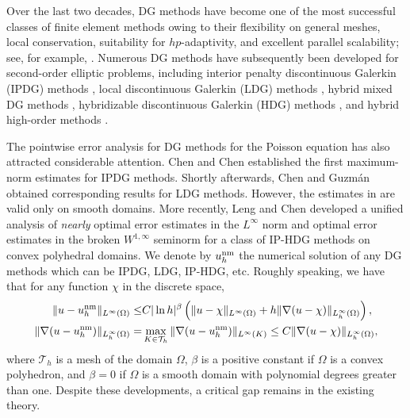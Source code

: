 \documentclass[1996/10/24]{amsart}
\theoremstyle{definition}
\numberwithin{equation}{section}
\begin{document}
Over the last two decades, DG methods have become one of the most successful classes of finite element methods owing to their flexibility on general meshes, local conservation, suitability for $hp$-adaptivity, and excellent parallel scalability; see, for example, \cite{c2002,de2011}. Numerous DG methods have subsequently been developed for second-order elliptic problems, including interior penalty discontinuous Galerkin (IPDG) methods \cite{abcm2002, mss2017}, local discontinuous Galerkin (LDG) methods \cite{c2006, ccps2000, ckps2001}, hybrid mixed DG methods \cite{es2010}, hybridizable discontinuous Galerkin (HDG) methods \cite{cgl2009, cgnps2011, lc2022, qs2016}, and hybrid high-order methods \cite{be2018, cel2019}. 

The pointwise error analysis for DG methods for the Poisson equation has also attracted considerable attention.
Chen and Chen \cite{cc2005} established the first maximum-norm estimates for IPDG methods. Shortly afterwards, Chen \cite{c2005} and Guzm\'an \cite{g2006} obtained corresponding results for LDG methods. However, the estimates in \cite{cc2005,c2005,g2006} are valid only on smooth domains.
More recently, Leng and Chen \cite{lc2026} developed a unified analysis of \emph{nearly} optimal error estimates
in the $L^{\infty}$ norm and optimal error estimates in the broken $W^{1,\infty}$ seminorm for a class of IP-HDG methods on convex polyhedral domains. We denote by $u_h^{{\rm nm}}$ the numerical solution of any DG methods
which can be IPDG, LDG, IP-HDG, etc. Roughly speaking, we have that for any function $\chi$ in the discrete space,
\begin{align}
\|u-u_h^{{\rm nm}}\|_{L^{\infty}(\Omega)}\leq& C|\ln h|^{\beta}\left(\|u-\chi\|_{L^{\infty}(\Omega)}+h\|\nabla(u-\chi)\|_{L_h^{\infty}(\Omega)}\right),\label{nm-mn:1}\\
\|\nabla(u-u_h^{{\rm nm}})\|_{L_h^{\infty}(\Omega)}=&\max_{K\in\mathcal T_h} \|\nabla (u - u_{h}^{\rm nm}) \|_{L^\infty(K)}\leq C\|\nabla(u-\chi)\|_{L_h^{\infty}(\Omega)},\label{nm-mn:2}
\end{align}
where $\mathcal{T}_h$ is a mesh of the domain $\Omega$, $\beta$ is a positive constant if $\Omega$ is a convex polyhedron, and $\beta = 0$ if $\Omega$
is a smooth domain with polynomial degrees greater than one. Despite these developments, a critical gap remains in the existing theory.
\end{document}
